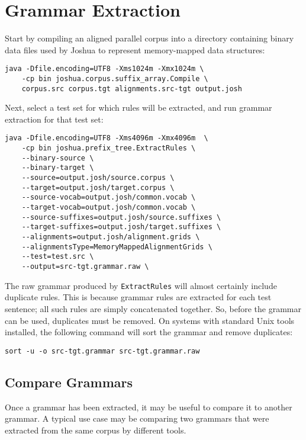 \chapter{Grammar Extraction}

Start by compiling an aligned parallel corpus into a directory containing binary data files used by Joshua to represent memory-mapped data structures:

\begin{verbatim}
java -Dfile.encoding=UTF8 -Xms1024m -Xmx1024m \
    -cp bin joshua.corpus.suffix_array.Compile \
    corpus.src corpus.tgt alignments.src-tgt output.josh
\end{verbatim}

Next, select a test set for which rules will be extracted, and run grammar extraction for that test set:

\begin{verbatim}
java -Dfile.encoding=UTF8 -Xms4096m -Xmx4096m  \
    -cp bin joshua.prefix_tree.ExtractRules \
    --binary-source \
    --binary-target \
    --source=output.josh/source.corpus \      
    --target=output.josh/target.corpus \      
    --source-vocab=output.josh/common.vocab \      
    --target-vocab=output.josh/common.vocab \  
    --source-suffixes=output.josh/source.suffixes \      
    --target-suffixes=output.josh/target.suffixes \
    --alignments=output.josh/alignment.grids \ 
    --alignmentsType=MemoryMappedAlignmentGrids \
    --test=test.src \
    --output=src-tgt.grammar.raw \
\end{verbatim}

The raw grammar produced by {\tt ExtractRules} will almost certainly include duplicate rules. This is because grammar rules are extracted for each test sentence; all such rules are simply concatenated together. So, before the grammar can be used, duplicates must be removed. On systems with standard Unix tools installed, the following command will sort the grammar and remove duplicates:

\begin{verbatim}
sort -u -o src-tgt.grammar src-tgt.grammar.raw
\end{verbatim}

\section{Compare Grammars}

Once a grammar has been extracted, it may be useful to compare it to another grammar. A typical use case may be comparing two grammars that were extracted from the same corpus by different tools.

